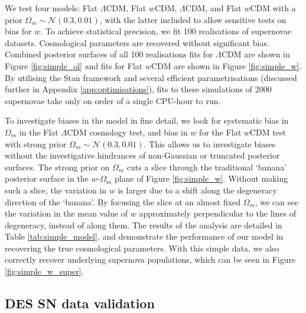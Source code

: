 \documentclass[a4paper,fleqn,usenatbib]{emulateapj}
\begin{document}
We test four models: Flat $\Lambda$CDM, Flat $w$CDM, $\Lambda$CDM, and Flat $w$CDM with a prior $\Omega_m \sim \mathcal{N}(0.3, 0.01)$, with the latter included to allow sensitive tests on bias for $w$. To achieve statistical precision, we fit 100 realisations of supernovae datasets. Cosmological parameters are recovered without significant bias. Combined posterior surfaces of all 100 realisations fits for $\Lambda$CDM are shown in Figure \ref{fig:simple_ol} and fits for Flat $w$CDM are shown in Figure \ref{fig:simple_w}. By utilising the Stan framework and several efficient parametrisations (discussed further in Appendix \ref{app:optimisations}), fits to these simulations of 2000 supernovae take only on order of a single CPU-hour to run.

To investigate biases in the model in fine detail, we look for systematic bias in $\Omega_m$ in the Flat $\Lambda$CDM cosmology test, and bias in $w$ for the Flat $w$CDM test with strong prior $\Omega_m \sim \mathcal{N}(0.3, 0.01)$. This allows us to investigate biases without the investigative hindrances of non-Gaussian or truncated posterior surfaces. The strong prior on $\Omega_m$ cuts a slice through the traditional `banana' posterior surface in the $w$-$\Omega_m$ plane of Figure \ref{fig:simple_w}. Without making such a slice, the variation in $w$ is larger due to a shift along the degeneracy direction of the `banana'. By focusing the slice at an almost fixed $\Omega_m$, we can see the variation in the mean value of $w$ approximately perpendicular to the lines of degeneracy, instead of along them. The results of the analysis are detailed in Table \ref{tab:simple_model}, and demonstrate the performance of our model in recovering the true cosmological parameters. With this simple data, we also correctly recover underlying supernova populations, which can be seen in Figure \ref{fig:simple_w_super}.




















\subsection{DES SN data validation}
\label{sec:simdes}
\end{document}
